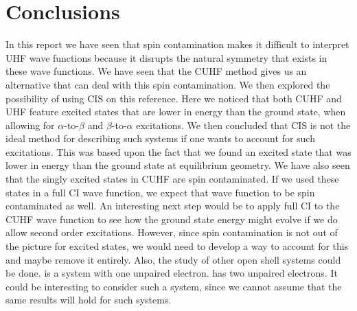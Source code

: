 \documentclass[twoside,twocolumn,9pt]{article}
\renewcommand{\refname}{Notes and references}
\begin{document}
\section{Conclusions}
In this report we have seen that spin contamination makes it difficult to interpret UHF wave functions because it disrupts the natural symmetry that exists in these wave functions.
We have seen that the CUHF method gives us an alternative that can deal with this spin contamination. We then explored the possibility of using CIS on this reference. Here we
noticed that both CUHF and UHF feature excited states that are lower in energy than the ground state, when allowing for $\alpha$-to-$\beta$ and $\beta$-to-$\alpha$ excitations.
We then concluded that CIS is not the ideal method for describing such systems if one wants to account for such excitations. This was based upon the fact that we found an excited
state that was lower in energy than the ground state at equilibrium geometry. We have also seen that the singly excited states in CUHF are spin contaminated. If we used these
states in a full CI wave function, we expect that wave function to be spin contaminated as well.
An interesting next step would be to apply full CI to the CUHF wave function to see how the ground state energy might evolve if we do allow second order excitations. However, since
spin contamination is not out of the picture for excited states, we would need to develop a way to account for this and maybe remove it entirely. Also, the
study of other open shell systems could be done.  is a system with one unpaired electron.  has two unpaired electrons. It could be interesting to consider such a system,
since we cannot assume that the same results will hold for such systems.






\balance


\end{document}

